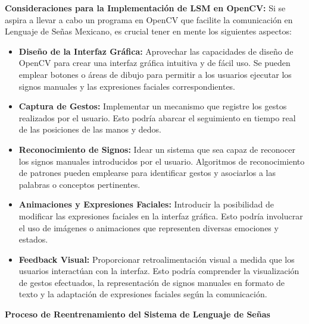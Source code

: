 \documentclass[conference]{IEEEtran}
\begin{document}
\textbf{Consideraciones para la Implementación de LSM en OpenCV:}
Si se aspira a llevar a cabo un programa en OpenCV que facilite la comunicación en Lenguaje de Señas Mexicano, es crucial tener en mente los siguientes aspectos:
\begin{itemize}
    \item \textbf{Diseño de la Interfaz Gráfica:} Aprovechar las capacidades de diseño de OpenCV para crear una interfaz gráfica intuitiva y de fácil uso. Se pueden emplear botones o áreas de dibujo para permitir a los usuarios ejecutar los signos manuales y las expresiones faciales correspondientes.

    \item \textbf{Captura de Gestos:} Implementar un mecanismo que registre los gestos realizados por el usuario. Esto podría abarcar el seguimiento en tiempo real de las posiciones de las manos y dedos.

    \item \textbf{Reconocimiento de Signos:} Idear un sistema que sea capaz de reconocer los signos manuales introducidos por el usuario. Algoritmos de reconocimiento de patrones pueden emplearse para identificar gestos y asociarlos a las palabras o conceptos pertinentes.

    \item \textbf{Animaciones y Expresiones Faciales:} Introducir la posibilidad de modificar las expresiones faciales en la interfaz gráfica. Esto podría involucrar el uso de imágenes o animaciones que representen diversas emociones y estados.

    \item \textbf{Feedback Visual:} Proporcionar retroalimentación visual a medida que los usuarios interactúan con la interfaz. Esto podría comprender la visualización de gestos efectuados, la representación de signos manuales en formato de texto y la adaptación de expresiones faciales según la comunicación.
    
\end{itemize}

\textbf{Proceso de Reentrenamiento del Sistema de Lenguaje de Señas}
\end{document}
